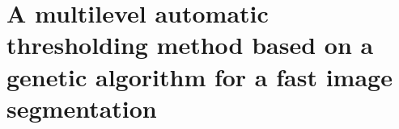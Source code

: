 \documentclass[12pt,oneside,a4paper,english,french,spanish,brazil,]{abntex2}
\begin{document}
\section{A multilevel automatic thresholding method based on a genetic algorithm for a fast image segmentation}

\end{document}
